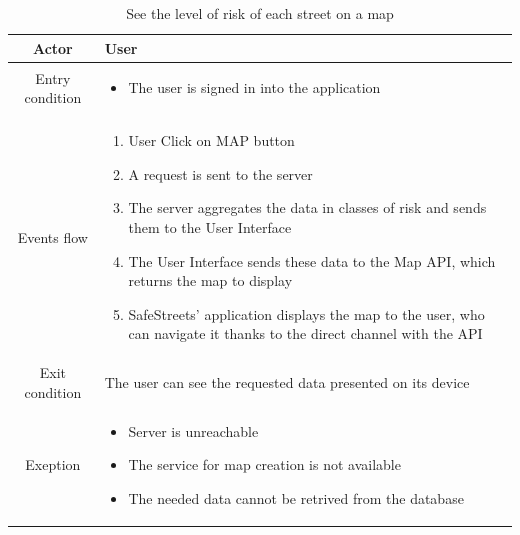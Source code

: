 \documentclass{article}
\begin{document}
		\begin{table} [H]
		\begin{center}
		\caption{See the level of risk of each street on a map}
		\begin{tabular}{|c|p{8cm}|}
			\hline
			Actor			&	User\\
			\hline
			Entry condition	&	\begin{itemize}[noitemsep,topsep=0pt]
								\item The user is signed in into the application
								\end{itemize}\\
			\hline
			 Events flow		&	\begin{enumerate}[noitemsep,topsep=0pt]
									\item User Click on MAP button			
									\item A request is sent to the server
									\item The server aggregates the data in classes of risk
									and sends them to the User Interface
									\item The User Interface sends these data to the Map API,
									which returns the map to display
									\item SafeStreets' application displays the map to 
									the user, who can navigate it thanks to the direct
									channel with the API
								\end{enumerate}\\
			\hline
			Exit condition 	&	The user can see the requested data presented on its device\\
			\hline
			Exeption			&	\begin{itemize}[noitemsep,topsep=0pt]
									\item Server is unreachable
									\item The service for map creation is not available
									\item The needed data cannot be retrived from the database
								\end{itemize}\\
			\hline
		\end{tabular}
		\end{center}
		\end{table} 
\end{document}

